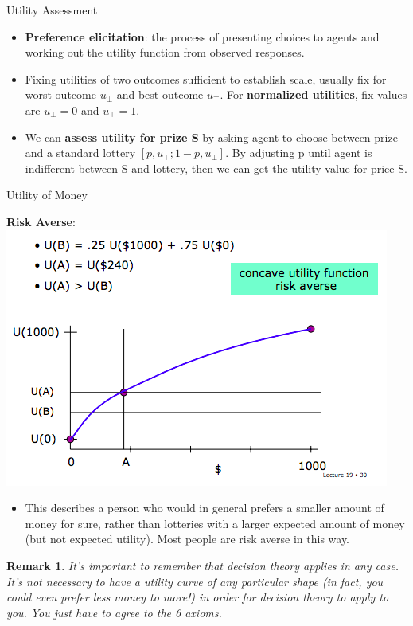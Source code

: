\documentclass[12pt]{article}
\newtheorem*{remark}{Remark}
\begin{document}
\pagebreak
\noindent
{\large{Utility Assessment}}\\
\begin{tcolorbox}
\begin{itemize}
\item \textbf{Preference elicitation}: the process of presenting choices to agents and working out the utility function from observed responses.
\item Fixing utilities of two outcomes sufficient to establish scale, usually fix for worst outcome $u_{\bot}$ and best outcome $u_{\top}$. For \textbf{normalized utilities}, fix values are $u_{\bot} = 0$ and $u_{\top}= 1$.
\item We can \textbf{assess utility for prize S} by asking agent to choose between prize and a standard lottery $[p, u_{\top}; 1-p, u_{\bot}]$. By adjusting p until agent is indifferent between S and lottery, then we can get the utility value for price S.
\end{itemize}
\end{tcolorbox}

\noindent
{\large{Utility of Money}}\\

\begin{tcolorbox}
\textbf{Risk Averse}: \\

\includegraphics[scale=0.5]{p9}\\

\begin{itemize}
\item This describes a person who would in general prefers a smaller
amount of money for sure, rather than lotteries with a larger expected
amount of money (but not expected utility). Most people are risk averse in
this way.
\end{itemize}
\end{tcolorbox}
\begin{remark}
It's important to remember that decision theory applies in any case. It's not
necessary to have a utility curve of any particular shape (in fact, you could
even prefer less money to more!) in order for decision theory to apply to you.
You just have to agree to the 6 axioms.
\end{remark}
\end{document}
